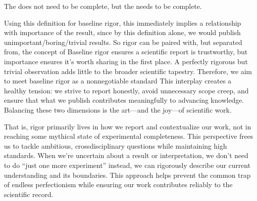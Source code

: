\documentclass[letterpaper,10pt,english]{sphinxmanual}
\begin{document}
\sphinxAtStartPar
The  does not need to be complete, but the  needs to be complete.

\sphinxAtStartPar
Using this definition for baseline rigor, this immediately implies a relationship with importance of the result, since by this definition alone, we would publish unimportant/boring/trivial results.
So rigor can be paired with, but separated from, the concept of 
Baseline rigor ensures a scientific report is trustworthy, but importance ensures it’s worth sharing in the first place.
A perfectly rigorous but trivial observation adds little to the broader scientific tapestry.
Therefore, we aim to meet baseline rigor as a non\sphinxhyphen{}negotiable standard 
This interplay creates a healthy tension: we strive to report honestly, avoid unnecessary scope creep, and ensure that what we publish contributes meaningfully to advancing knowledge.
Balancing these two dimensions is the art—and the joy—of scientific work.

\sphinxAtStartPar
That is, rigor primarily lives in how we report and contextualize our work, not in reaching some mythical state of experimental completeness.
This perspective frees us to tackle ambitious, cross\sphinxhyphen{}disciplinary questions while maintaining high standards.
When we’re uncertain about a result or interpretation, we don’t need to do “just one more experiment” \textendash{} instead, we can rigorously describe our current understanding and its boundaries.
This approach helps prevent the common trap of endless perfectionism while ensuring our work contributes reliably to the scientific record.
\end{document}
